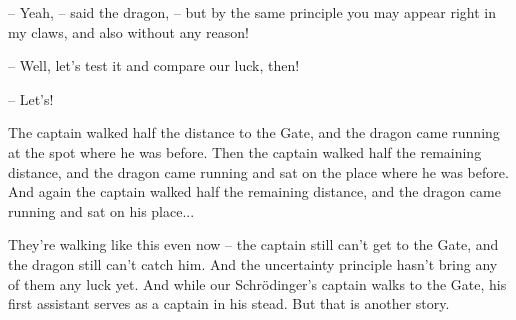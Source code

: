 \documentclass[ebook,twoside,final,openright]{memoir}
\begin{document}
– Yeah, – said the dragon, – but by the same principle you may appear right in my claws, and also without any reason!\par
– Well, let’s test it and compare our luck, then!\par
– Let’s!\par
\par
The captain walked half the distance to the Gate, and the dragon came running at the spot where he was before. Then the captain walked half the remaining distance, and the dragon came running and sat on the place where he was before. And again the captain walked half the remaining distance, and the dragon came running and sat on his place...\par
\par
They're walking like this even now – the captain still can’t get to the Gate, and the dragon still can’t catch him. And the uncertainty principle hasn’t bring any of them any luck yet. And while our Schrödinger’s captain walks to the Gate, his first assistant serves as a captain in his stead. But that is another story.
\end{document}
